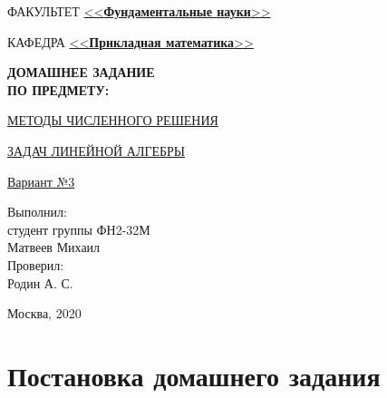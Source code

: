 \documentclass[a4paper]{article}
\begin{document}
\begin{titlepage}
\begin{center}
\fontsize{12pt}{0.1\baselineskip}\selectfont
\noindent\makebox[\linewidth]{\rule{\textwidth}{4pt}} \makebox[\linewidth]{\rule{\textwidth}{1pt}}
\end{center}

\begin{flushleft}
\fontsize{12pt}{0.8\baselineskip}
\selectfont
ФАКУЛЬТЕТ \uline{<<\textbf{Фундаментальные науки}>>}
			
КАФЕДРА \hspace{4mm} \uline{<<\textbf{Прикладная математика}>>}
\end{flushleft}

\vspace{3mm}

\begin{center}
	\begin{large}
		\textbf{ДОМАШНЕЕ ЗАДАНИЕ \\ ПО ПРЕДМЕТУ:}
	\end{large}
\end{center}

\begin{center}
\begin{large}		
\uline{МЕТОДЫ ЧИСЛЕННОГО РЕШЕНИЯ}
	
\uline{ЗАДАЧ ЛИНЕЙНОЙ АЛГЕБРЫ}

\uline{Вариант №3}	
\end{large}
\end{center}

\vfill

\begin{flushright}
Выполнил: \\
студент группы ФН2-32М \\
Матвеев Михаил \\
\vspace{5mm}
Проверил: \\
Родин А. С. \\
\end{flushright}

\vfill

\begin{center}
\normalsize{Москва, 2020}
\end{center}

\end{titlepage}

\newpage

\tableofcontents

\newpage

\section{Постановка домашнего задания}
\end{document}
